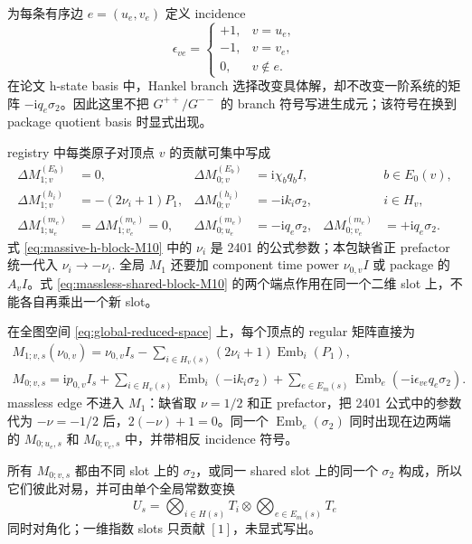 \documentclass[11pt,a4paper]{ctexart}
\newcommand{\ii}{\mathrm i}
\newcommand{\Emb}{\operatorname{Emb}}
\begin{document}
为每条有序边 $e=(u_e,v_e)$ 定义 incidence
\begin{equation}
 \epsilon_{ve}=
 \begin{cases}
 +1,&v=u_e,\\
 -1,&v=v_e,\\
 0,&v\notin e.
 \end{cases}
\end{equation}
在论文 h-state basis 中，Hankel branch 选择改变具体解，却不改变一阶系统的矩阵 $-\ii q_e\sigma_2$。因此这里不把 $G^{++}/G^{--}$ 的 branch 符号写进生成元；该符号在换到 package quotient basis 时显式出现。

registry 中每类原子对顶点 $v$ 的贡献可集中写成
\begin{align}
 \Delta M_{1;v}^{(E_b)}&=0,
 &\Delta M_{0;v}^{(E_b)}&=\ii\chi_bq_b I,
 &&b\in E_0(v),
 \label{eq:phase-block-M10}\\
 \Delta M_{1;v}^{(h_i)}&=-(2\nu_i+1)P_1,
 &\Delta M_{0;v}^{(h_i)}&=-\ii k_i\sigma_2,
 &&i\in H_v,
 \label{eq:massive-h-block-M10}\\
 \Delta M_{1;u_e}^{(m_e)}&=\Delta M_{1;v_e}^{(m_e)}=0,
 &\Delta M_{0;u_e}^{(m_e)}&=-\ii q_e\sigma_2,
 &\Delta M_{0;v_e}^{(m_e)}&=+\ii q_e\sigma_2.
 \label{eq:massless-shared-block-M10}
\end{align}
式 \eqref{eq:massive-h-block-M10} 中的 $\nu_i$ 是 2401 的公式参数；本包缺省正 prefactor 统一代入 $\nu_i\to-\nu_i$. 全局 $M_1$ 还要加 component time power $\nu_{0,v}I$ 或 package 的 $A_vI$。式 \eqref{eq:massless-shared-block-M10} 的两个端点作用在同一个二维 slot 上，不能各自再乘出一个新 slot。

在全图空间 \eqref{eq:global-reduced-space} 上，每个顶点的 regular 矩阵直接为
\begin{align}
 \boxed{
 M_{1;v,s}(\nu_{0,v})
 =\nu_{0,v}I_s
 -\sum_{i\in H_v(s)}(2\nu_i+1)\Emb_i(P_1),
 }
 \label{eq:global-M1}\\
 \boxed{
 M_{0;v,s}
 =\ii p_{0,v}I_s
 +\sum_{i\in H_v(s)}\Emb_i(-\ii k_i\sigma_2)
 +\sum_{e\in E_m(s)}\Emb_e(-\ii\epsilon_{ve}q_e\sigma_2).
 }
 \label{eq:global-M0}
\end{align}
massless edge 不进入 $M_1$：缺省取 $\nu=1/2$ 和正 prefactor，把 2401 公式中的参数代为 $-\nu=-1/2$ 后，$2(-\nu)+1=0$。同一个 $\Emb_e(\sigma_2)$ 同时出现在边两端的 $M_{0;u_e,s}$ 和 $M_{0;v_e,s}$ 中，并带相反 incidence 符号。

所有 $M_{0;v,s}$ 都由不同 slot 上的 $\sigma_2$，或同一 shared slot 上的同一个 $\sigma_2$ 构成，所以它们彼此对易，并可由单个全局常数变换
\begin{equation}
 U_s
 =\bigotimes_{i\in H(s)}T_i
 \otimes\bigotimes_{e\in E_m(s)}T_e
 \label{eq:global-T}
\end{equation}
同时对角化；一维指数 slots 只贡献 $[1]$，未显式写出。
\end{document}
